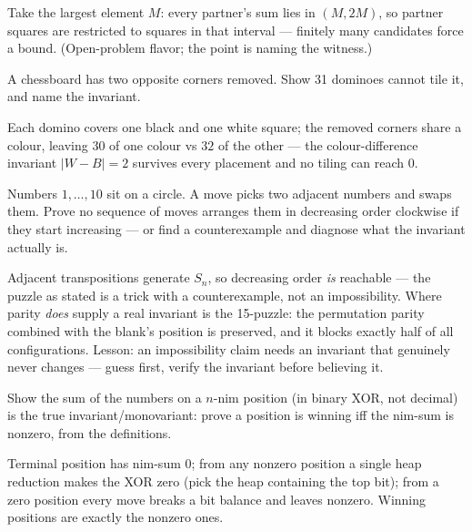 \begin{solution}
Take the largest element $M$: every partner's sum lies in
$(M, 2M)$, so partner squares are restricted to squares in that
interval --- finitely many candidates force a bound. (Open-problem
flavor; the point is naming the witness.)
\end{solution}
\begin{exercise}[easy]\label{exr:i13}
A chessboard has two opposite corners removed. Show 31 dominoes cannot
tile it, and name the invariant.
\end{exercise}
\begin{solution}
Each domino covers one black and one white square; the removed corners
share a colour, leaving $30$ of one colour vs $32$ of the other ---
the colour-difference invariant $|W-B|=2$ survives every placement and
no tiling can reach $0$.
\end{solution}
\begin{exercise}[medium]\label{exr:i14}
Numbers $1,\dots,10$ sit on a circle. A move picks two adjacent
numbers and swaps them. Prove no sequence of moves arranges them in
decreasing order clockwise if they start increasing --- or find a
counterexample and diagnose what the invariant actually is.
\end{exercise}
\begin{solution}
Adjacent transpositions generate $S_n$, so decreasing order
\emph{is} reachable --- the puzzle as stated is a trick with a
counterexample, not an impossibility. Where parity \emph{does} supply
a real invariant is the 15-puzzle: the permutation parity combined with
the blank's position is preserved, and it blocks exactly half of all
configurations. Lesson: an impossibility claim needs an invariant that
genuinely never changes --- guess first, verify the invariant before
believing it.
\end{solution}
\begin{exercise}[hard]\label{exr:i15}
Show the sum of the numbers on a $n$-nim position (in binary XOR,
not decimal) is the true invariant/monovariant: prove a position is
winning iff the nim-sum is nonzero, from the definitions.
\end{exercise}
\begin{solution}
Terminal position has nim-sum $0$; from any nonzero position a single
heap reduction makes the XOR zero (pick the heap containing the top
bit); from a zero position every move breaks a bit balance and leaves
nonzero. Winning positions are exactly the nonzero ones.
\end{solution}

